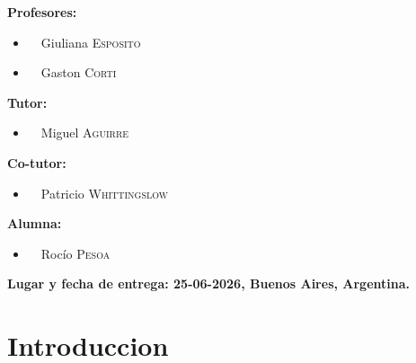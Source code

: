 \documentclass[12pt,a4paper]{article}
\begin{document}
{\raggedright{}
\large
\bf{Profesores:}
\begin{center}
    \begin{itemize}
    \item \ \  Giuliana     \textsc{Esposito}\\
    \item \ \  Gaston     \textsc{Corti}\\
\end{itemize}

\end{center}
\vspace{0.5 cm}
\bf{Tutor:}
\begin{center}
    \begin{itemize}
    \item \ \  Miguel     \textsc{Aguirre}\\
    \end{itemize}
\end{center}
\bf{Co-tutor:}
\begin{center}
    \begin{itemize}
    \item \ \  Patricio     \textsc{Whittingslow}\\
    \end{itemize}
\end{center}
\vspace{0.5 cm}
\bf{Alumna:}
\begin{center}
    \begin{itemize}
     
     \item  \ \ Rocío    \textsc{Pesoa}\\
     
\end{itemize}
\end{center}
\vspace{0.5 cm}
{\bf{Lugar y fecha de entrega:} 25-06-2026,   Buenos Aires, Argentina.}
}


\vfill
\vspace{0.7cm}


\pagestyle{fancy}
\headheight=60pt 	%


\tableofcontents
\newpage
\section{Introduccion}
\end{document}
